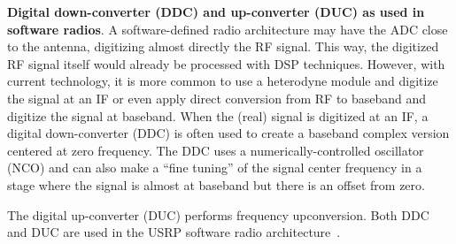 \bApplication
\textbf{Digital down-converter (DDC) and up-converter (DUC) as used in software radios}.
\label{app:pre-processing}
A software-defined radio architecture may have the ADC close to the antenna, digitizing almost directly the RF signal. This way, the digitized RF signal itself would already be processed with DSP techniques. However, with current technology, it is more common to use a heterodyne module and digitize the signal at an IF or even apply direct conversion from RF to baseband and digitize the signal at baseband.
When the (real) signal is digitized at an IF, a digital down-converter (DDC) is often used to create a baseband complex version centered at zero frequency.
The DDC uses a numerically-controlled oscillator (NCO) and can also make a ``fine tuning'' of the signal center frequency in a stage where the signal is almost at baseband but there is an offset from zero.

The digital up-converter (DUC) performs frequency upconversion. Both DDC and DUC are used in the USRP software radio architecture~.
\eApplication






